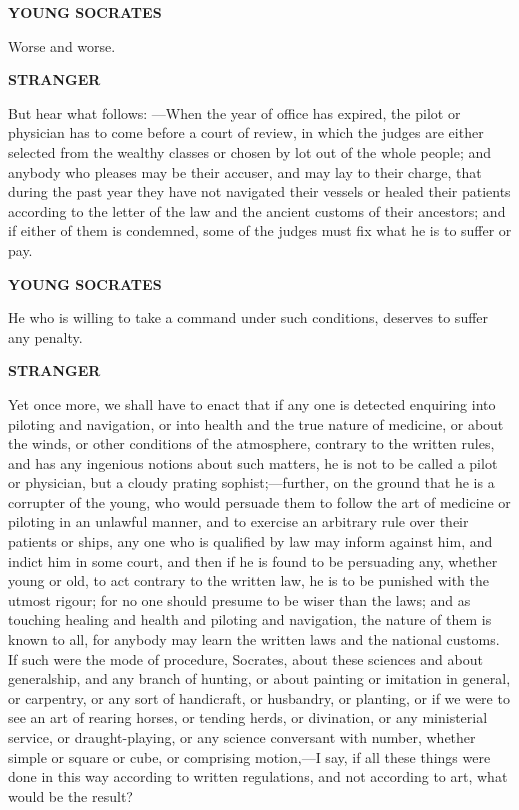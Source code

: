 \documentclass[11pt,letter]{article}
\begin{document}
\par \textbf{YOUNG SOCRATES}
\par   Worse and worse.

\par \textbf{STRANGER}
\par   But hear what follows: —When the year of office has expired, the pilot or physician has to come before a court of review, in which the judges are either selected from the wealthy classes or chosen by lot out of the whole people; and anybody who pleases may be their accuser, and may lay to their charge, that during the past year they have not navigated their vessels or healed their patients according to the letter of the law and the ancient customs of their ancestors; and if either of them is condemned, some of the judges must fix what he is to suffer or pay.

\par \textbf{YOUNG SOCRATES}
\par   He who is willing to take a command under such conditions, deserves to suffer any penalty.

\par \textbf{STRANGER}
\par   Yet once more, we shall have to enact that if any one is detected enquiring into piloting and navigation, or into health and the true nature of medicine, or about the winds, or other conditions of the atmosphere, contrary to the written rules, and has any ingenious notions about such matters, he is not to be called a pilot or physician, but a cloudy prating sophist;—further, on the ground that he is a corrupter of the young, who would persuade them to follow the art of medicine or piloting in an unlawful manner, and to exercise an arbitrary rule over their patients or ships, any one who is qualified by law may inform against him, and indict him in some court, and then if he is found to be persuading any, whether young or old, to act contrary to the written law, he is to be punished with the utmost rigour; for no one should presume to be wiser than the laws; and as touching healing and health and piloting and navigation, the nature of them is known to all, for anybody may learn the written laws and the national customs. If such were the mode of procedure, Socrates, about these sciences and about generalship, and any branch of hunting, or about painting or imitation in general, or carpentry, or any sort of handicraft, or husbandry, or planting, or if we were to see an art of rearing horses, or tending herds, or divination, or any ministerial service, or draught-playing, or any science conversant with number, whether simple or square or cube, or comprising motion,—I say, if all these things were done in this way according to written regulations, and not according to art, what would be the result?
\end{document}
